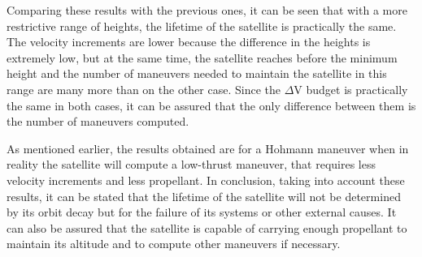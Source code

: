 Comparing these results with the previous ones, it can be seen that with a more restrictive range of heights, the lifetime of the satellite is practically the same. The velocity increments are lower because the difference in the heights is extremely low, but at the same time, the satellite reaches before the minimum height and the number of maneuvers needed to maintain the satellite in this range are many more than on the other case. Since the $\Delta$V budget is practically the same in both cases, it can be assured that the only difference between them is the number of maneuvers computed.

As mentioned earlier, the results obtained are for a Hohmann maneuver when in reality the satellite will compute a low-thrust maneuver, that requires less velocity increments and less propellant. In conclusion, taking into account these results, it can be stated that the lifetime of the satellite will not be determined by its orbit decay but for the failure of its systems or other external causes. It can also be assured that the satellite is capable of carrying enough propellant to maintain its altitude and to compute other maneuvers if necessary.